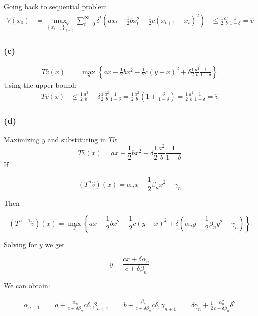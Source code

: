 \documentclass{article}
\theoremstyle{definition}
\begin{document}
Going back to  sequential problem
$$
\begin{aligned}
V\left(x_{0}\right) &=\max _{\left\{x_{i+1}\right\}_{t=0}^{\infty}} \sum_{t=0}^{\infty} \delta^{t}\left(a x_{t}-\frac{1}{2} b x_{t}^{2}-\frac{1}{2} c\left(x_{t+1}-x_{t}\right)^{2}\right)
& \leq \frac{1}{2} \frac{a^{2}}{b} \frac{1}{1-\delta}=\widehat{v}
\end{aligned}
$$
\subsubsection*{(c)}
$$
\begin{aligned}
T \hat{v}(x) &=\max _{y}\left\{a x-\frac{1}{2} b x^{2}-\frac{1}{2} c(y-x)^{2}+\delta \frac{1}{2} \frac{a^{2}}{b} \frac{1}{1-\delta}\right\}\end{aligned} $$
Using the upper bound:
$$\begin{aligned}
T \hat{v}(x)& \leq \frac{1}{2} \frac{a^{2}}{b}+\delta \frac{1}{2} \frac{a^{2}}{b} \frac{1}{1-\delta} = \frac{1}{2} \frac{a^{2}}{b}\left(1+\frac{\delta}{1-\delta}\right)=\frac{1}{2} \frac{a^{2}}{b} \frac{1}{1-\delta}=\widehat{v}
\end{aligned}
$$


\subsubsection*{(d)} 
Maximizing $y$ and substituting in $T\hat{v}$:
$$
T \hat{v}(x)=a x-\frac{1}{2} b x^{2}+\delta \frac{1}{2} \frac{a^{2}}{b} \frac{1}{1-\delta}
$$
If

$$
\left(T^{n} \widehat{v}\right)(x)=\alpha_{n} x-\frac{1}{2} \beta_{n} x^{2}+\gamma_{n}
$$

Then

$$
\left(T^{n+1} \widehat{v}\right)(x)=\max _{y}\left\{a x-\frac{1}{2} b x^{2}-\frac{1}{2} c(y-x)^{2}+\delta\left(\alpha_{n} y-\frac{1}{2} \beta_{n} y^{2}+\gamma_{n}\right)\right\}
$$

Solving for $y$ we get

$$
y=\frac{c x+\delta \alpha_{n}}{c+\delta \beta_{n}} 
$$

We can obtain:

$$
\begin{aligned}
\alpha_{n+1} &=a+\frac{\alpha_{n}}{c+\delta \beta_{n}} c \delta,
\beta_{n+1} &=b+\frac{\beta_{n}}{c+\delta \beta_{n}} c \delta ,
\gamma_{n+1} &=\delta \gamma_{n}+\frac{1}{2} \frac{\alpha_{n}^{2}}{c+\delta \beta_{n}} \delta^{2}
\end{aligned}
$$
\end{document}
